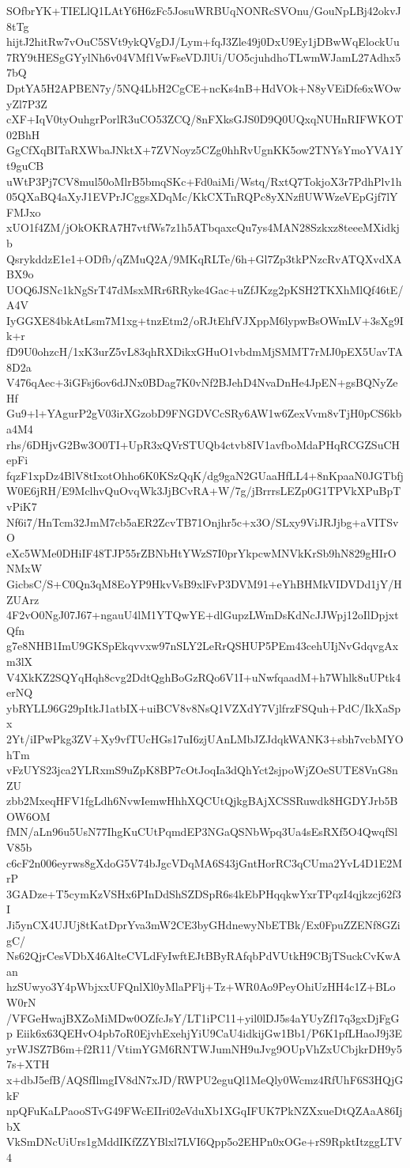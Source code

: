 SOfbrYK+TIELlQ1LAtY6H6zFc5JosuWRBUqNONRcSVOnu/GouNpLBj42okvJ8tTg
hijtJ2hitRw7vOuC5SVt9ykQVgDJ/Lym+fqJ3Zle49j0DxU9Ey1jDBwWqElockUu
7RY9tHESgGYylNh6v04VMf1VwFseVDJlUi/UO5cjuhdhoTLwmWJamL27Adhx57bQ
DptYA5H2APBEN7y/5NQ4LbH2CgCE+ncKs4nB+HdVOk+N8yVEiDfe6xWOwyZl7P3Z
cXF+IqV0tyOuhgrPorlR3uCO53ZCQ/8nFXksGJS0D9Q0UQxqNUHnRIFWKOT02BhH
GgCfXqBITaRXWbaJNktX+7ZVNoyz5CZg0hhRvUgnKK5ow2TNYsYmoYVA1Yt9guCB
uWtP3Pj7CV8mul50oMlrB5bmqSKc+Fd0aiMi/Wstq/RxtQ7TokjoX3r7PdhPlv1h
05QXaBQ4aXyJ1EVPrJCggsXDqMc/KkCXTnRQPc8yXNzflUWWzeVEpGjf7lYFMJxo
xUO1f4ZM/jOkOKRA7H7vtfWs7z1h5ATbqaxcQu7ys4MAN28Szkxz8teeeMXidkjb
QsrykddzE1e1+ODfb/qZMuQ2A/9MKqRLTe/6h+Gl7Zp3tkPNzcRvATQXvdXABX9o
UOQ6JSNc1kNgSrT47dMsxMRr6RRyke4Gac+uZfJKzg2pKSH2TKXhMlQf46tE/A4V
IyGGXE84bkAtLsm7M1xg+tnzEtm2/oRJtEhfVJXppM6lypwBsOWmLV+3sXg9Ik+r
fD9U0ohzcH/1xK3urZ5vL83qhRXDikxGHuO1vbdmMjSMMT7rMJ0pEX5UavTA8D2a
V476qAec+3iGFsj6ov6dJNx0BDag7K0vNf2BJehD4NvaDnHe4JpEN+gsBQNyZeHf
Gu9+l+YAgurP2gV03irXGzobD9FNGDVCcSRy6AW1w6ZexVvm8vTjH0pCS6kba4M4
rhs/6DHjvG2Bw3O0TI+UpR3xQVrSTUQb4ctvb8IV1avfboMdaPHqRCGZSuCHepFi
fqzF1xpDz4BlV8tIxotOhho6K0KSzQqK/dg9gaN2GUaaHfLL4+8nKpaaN0JGTbfj
W0E6jRH/E9MclhvQuOvqWk3JjBCvRA+W/7g/jBrrrsLEZp0G1TPVkXPuBpTvPiK7
Nf6i7/HnTcm32JmM7cb5aER2ZcvTB71Onjhr5c+x3O/SLxy9ViJRJjbg+aVITSvO
eXc5WMe0DHiIF48TJP55rZBNbHtYWzS7I0prYkpcwMNVkKrSb9hN829gHIrONMxW
GicbsC/S+C0Qn3qM8EoYP9HkvVsB9xlFvP3DVM91+eYhBHMkVIDVDd1jY/HZUArz
4F2vO0NgJ07J67+ngauU4lM1YTQwYE+dlGupzLWmDsKdNcJJWpj12oIlDpjxtQfn
g7e8NHB1ImU9GKSpEkqvvxw97nSLY2LeRrQSHUP5PEm43cehUIjNvGdqvgAxm3lX
V4XkKZ2SQYqHqh8cvg2DdtQghBoGzRQo6V1I+uNwfqaadM+h7Whlk8uUPtk4erNQ
ybRYLL96G29pItkJ1atbIX+uiBCV8v8NsQ1VZXdY7VjlfrzFSQuh+PdC/IkXaSpx
2Yt/iIPwPkg3ZV+Xy9vfTUcHGs17uI6zjUAnLMbJZJdqkWANK3+sbh7vcbMYOhTm
vFzUYS23jca2YLRxmS9uZpK8BP7cOtJoqIa3dQhYct2sjpoWjZOeSUTE8VnG8nZU
zbb2MxeqHFV1fgLdh6NvwIemwHhhXQCUtQjkgBAjXCSSRuwdk8HGDYJrb5BOW6OM
fMN/aLn96u5UsN77IhgKuCUtPqmdEP3NGaQSNbWpq3Ua4sEsRXf5O4QwqfSlV85b
c6cF2n006eyrws8gXdoG5V74bJgcVDqMA6S43jGntHorRC3qCUma2YvL4D1E2MrP
3GADze+T5cymKzVSHx6PInDdShSZDSpR6s4kEbPHqqkwYxrTPqzI4qjkzcj62f3I
Ji5ynCX4UJUj8tKatDprYva3mW2CE3byGHdnewyNbETBk/Ex0FpuZZENf8GZigC/
Ns62QjrCesVDbX46AlteCVLdFyIwftEJtBByRAfqbPdVUtkH9CBjTSuckCvKwAan
hzSUwyo3Y4pWbjxxUFQnlXl0yMlaPFlj+Tz+WR0Ao9PeyOhiUzHH4c1Z+BLoW0rN
/VFGeHwajBXZoMiMDw0OZfcJsY/LT1iPC11+yil0lDJ5s4aYUyZf17q3gxDjFgGp
Eiik6x63QEHvO4pb7oR0EjvhExehjYiU9CaU4idkijGw1Bb1/P6K1pfLHaoJ9j3E
yrWJSZ7B6m+f2R11/VtimYGM6RNTWJumNH9uJvg9OUpVhZxUCbjkrDH9y57s+XTH
x+dbJ5efB/AQSfIlmgIV8dN7xJD/RWPU2eguQl1MeQly0Wcmz4RfUhF6S3HQjGkF
npQFuKaLPaooSTvG49FWcEIIri02eVduXb1XGqIFUK7PkNZXxueDtQZAaA86IjbX
VkSmDNcUiUrs1gMddIKfZZYBlxl7LVI6Qpp5o2EHPn0xOGe+rS9RpktItzggLTV4
